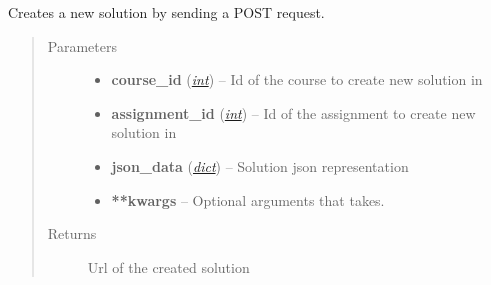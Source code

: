 \documentclass[letterpaper,10pt,english]{sphinxmanual}
\begin{document}

\begin{fulllineitems}
\label{web_portal:core.courses.api.create_solution}
Creates a new solution by sending a POST request.
\begin{quote}\begin{description}
\item[{Parameters}] \leavevmode\begin{itemize}
\item {} 
\textbf{course\_id} (\href{http://docs.python.org/library/functions.html\#int}{\emph{int}}) -- Id of the course to create new solution in

\item {} 
\textbf{assignment\_id} (\href{http://docs.python.org/library/functions.html\#int}{\emph{int}}) -- Id of the assignment to create new solution in

\item {} 
\textbf{json\_data} (\href{http://docs.python.org/library/stdtypes.html\#dict}{\emph{dict}}) -- Solution json representation

\item {} 
\textbf{**kwargs} -- Optional arguments that  takes.

\end{itemize}

\item[{Returns}] \leavevmode
Url of the created solution

\end{description}\end{quote}

\end{fulllineitems}

\end{document}
